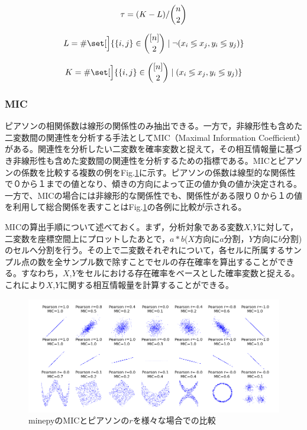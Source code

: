 \documentclass[review]{elsarticle}
\DeclarePairedDelimiter\set\{\}
\begin{document}
\begin{CJK}{UTF8}{min}
\begin{equation}\label{eq:kendall_tau}
\tau = (K-L)/\dbinom{n}{2}
\end{equation}

\begin{equation}\label{eq:kendall_L}
L = \# \set[\Big]{\{i,j\} \in \binom{[n]}{2} \mid \neg (x_i \lessgtr x_j, y_i \lessgtr y_j ) }
\end{equation}

\begin{equation}\label{eq:kendall_K}
K = \# \set[\Big]{\{i,j\} \in \binom{[n]}{2} \mid (x_i \lessgtr x_j, y_i \lessgtr y_j ) }
\end{equation}

\subsubsection{MIC}\label{mic}

ピアソンの相関係数は線形の関係性のみ抽出できる。一方で，非線形性も含めた二変数間の関連性を分析する手法としてMIC（Maximal Information Coefficient）がある\cite[][]{Reshef2011}。関連性を分析したい二変数を確率変数と捉えて，その相互情報量に基づき非線形性も含めた変数間の関連性を分析するための指標である。MICとピアソンの係数を比較する複数の例をFig.\ref{fig:mic}に示す。ピアソンの係数は線型的な関係性で０から１までの値となり、傾きの方向によって正の値か負の値か決定される。一方で、MICの場合には非線形的な関係性でも、関係性がある限り０から１の値を利用して総合関係を表すことはFig.\ref{fig:mic}の各例に比較が示される。

MICの算出手順について述べておく。まず，分析対象である変数\(X\),\(Y\)に対して，二変数を座標空間上にプロットしたあとで，\(a*b\)(\(X\)方向に\(a\)分割，\(Y\)方向に\(b\)分割)のセルへ分割を行う。その上で二変数それぞれについて，各セルに所属するサンプル点の数を全サンプル数で除すことでセルの存在確率を算出することができる。すなわち，\(X\),\(Y\)をセルにおける存在確率をベースとした確率変数と捉える。これにより\(X\),\(Y\)に関する相互情報量を計算することができる。

\begin{figure}[bh]
\centering
\includegraphics[width=0.9\linewidth]{MIC_pearson_relationships.png}
\caption{minepyのMICとピアソンの\(r\)を様々な場合での比較}
\label{fig:mic}
\end{figure}


\end{CJK}
\end{document}
